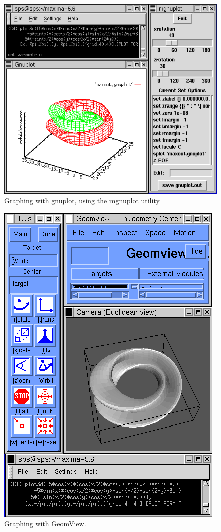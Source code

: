 \begin{figure}

\centering \includegraphics{images/maxima_gnuplot} \par
\caption{Graphing with gnuplot, using the mgnuplot utility}

\end{figure}


\begin{figure}

\centering \includegraphics{images/maxima_geomview} \par
\caption{Graphing with GeomView.}

\end{figure}



